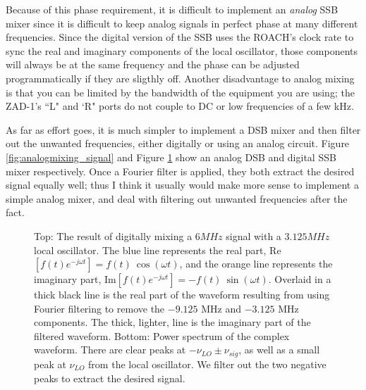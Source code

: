 \documentclass[12pt]{article}
\begin{document}
Because of this phase requirement, it is difficult to implement an \textit{analog} SSB mixer since it is difficult to keep analog signals in perfect phase at many different frequencies. Since the digital version of the SSB uses the ROACH's clock rate to sync the real and imaginary components of the local oscillator, those components will always be at the same frequency and the phase can be adjusted programmatically if they are sligthly off. Another disadvantage to analog mixing is that you can be limited by the bandwidth of the equipment you are using; the ZAD-1's ``L" and `R" ports do not couple to DC or low frequencies of a few kHz.

As far as effort goes, it is much simpler to implement a DSB mixer and then filter out the unwanted frequencies, either digitally or using an analog circuit. Figure \ref{fig:analogmixing_signal} and Figure \ref{fig:ssb} show an analog DSB and digital SSB mixer respectively. Once a Fourier filter is applied, they both extract the desired signal equally well; thus I think it usually would make more sense to implement a simple analog mixer, and deal with filtering out unwanted frequencies after the fact.

\begin{figure}[H]
\caption[SODUMB]{Top: The result of digitally mixing a $6 MHz$ signal with a $3.125 MHz$ local oscillator. The blue line represents the real part, Re${[f(t)e^{-j\omega t}]} = f(t)\ \cos(\omega t)$, and the orange line represents the imaginary part, Im${[f(t)e^{-j\omega t}]} = -f(t)\ \sin(\omega t)$. Overlaid in a thick black line is the real part of the waveform resulting from using Fourier filtering to remove the $-9.125$ MHz and $-3.125$ MHz components. The thick, lighter, line is the imaginary part of the filtered waveform. Bottom: Power spectrum of the complex waveform. There are clear peaks at $-\nu_{LO} \pm \nu_{sig}$, as well as a small peak at $\nu_{LO}$ from the local oscillator. We filter out the two negative peaks to extract the desired signal.}
\label{fig:ssb}
\end{figure}
\end{document}
